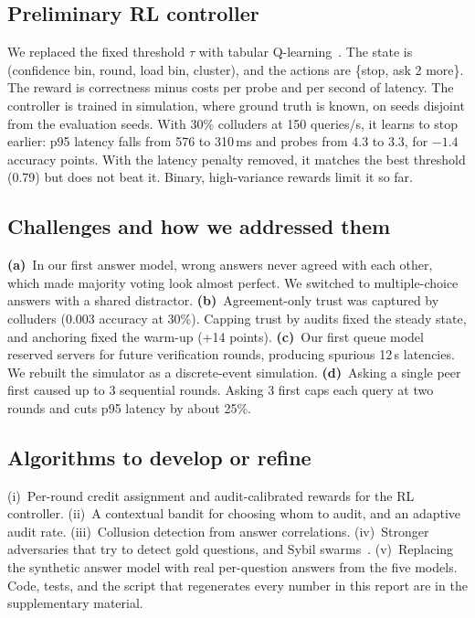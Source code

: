 \documentclass[conference]{IEEEtran}
\begin{document}
\subsection{Preliminary RL controller}
We replaced the fixed threshold $\tau$ with tabular Q-learning~\cite{qlearning}. The state is
(confidence bin, round, load bin, cluster), and the actions are \{stop, ask 2 more\}. The reward is
correctness minus costs per probe and per second of latency. The controller is trained in
simulation, where ground truth is known, on seeds disjoint from the evaluation seeds. With 30\%
colluders at 150 queries/s, it learns to stop earlier: p95 latency falls from 576 to 310\,ms and
probes from 4.3 to 3.3, for $-1.4$ accuracy points. With the latency penalty removed, it matches
the best threshold (0.79) but does not beat it. Binary, high-variance rewards limit it so far.

\subsection{Challenges and how we addressed them}
\textbf{(a)}~In our first answer model, wrong answers never agreed with each other, which made
majority voting look almost perfect. We switched to multiple-choice answers with a shared distractor.
\textbf{(b)}~Agreement-only trust was captured by colluders (0.003 accuracy at 30\%). Capping trust
by audits fixed the steady state, and anchoring fixed the warm-up (+14 points).
\textbf{(c)}~Our first queue model reserved servers for future verification rounds, producing
spurious 12\,s latencies. We rebuilt the simulator as a discrete-event simulation.
\textbf{(d)}~Asking a single peer first caused up to 3 sequential rounds. Asking 3 first caps each
query at two rounds and cuts p95 latency by about 25\%.

\subsection{Algorithms to develop or refine}
(i)~Per-round credit assignment and audit-calibrated rewards for the RL controller.
(ii)~A contextual bandit for choosing whom to audit, and an adaptive audit rate.
(iii)~Collusion detection from answer correlations.
(iv)~Stronger adversaries that try to detect gold questions, and Sybil swarms~\cite{sybil}.
(v)~Replacing the synthetic answer model with real per-question answers from the five models.
Code, tests, and the script that regenerates every number in this report are in the supplementary
material.



\end{document}
